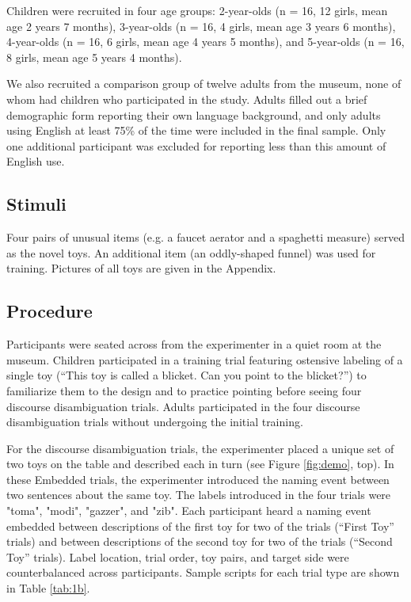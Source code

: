 \documentclass[man]{apa2}
\begin{document}
Children were recruited in four age groups: 2-year-olds (n = 16, 12 girls, mean age 2 years 7 months), 3-year-olds (n = 16, 4 girls, mean age 3 years 6 months), 4-year-olds (n = 16, 6 girls, mean age 4 years 5 months), and 5-year-olds (n = 16, 8 girls, mean age 5 years 4 months).  

We also recruited a comparison group of twelve adults from the museum, none of whom had children who participated in the study. Adults filled out a brief demographic form reporting their own language background, and only adults using English at least 75\% of the time were included in the final sample. Only one additional participant was excluded for reporting less than this amount of English use.  


\subsection{Stimuli}

Four pairs of unusual items (e.g. a faucet aerator and a spaghetti measure) served as the novel toys.  An additional item (an oddly-shaped funnel) was used for training. Pictures of all toys are given in the Appendix.

\subsection{Procedure}

Participants were seated across from the experimenter in a quiet room at the museum.  Children participated in a training trial featuring ostensive labeling of a single toy (``This toy is called a blicket.  Can you point to the blicket?'') to familiarize them to the design and to practice pointing before seeing four discourse disambiguation trials.  Adults participated in the four discourse disambiguation trials without undergoing the initial training. 

For the discourse disambiguation trials, the experimenter placed a unique set of two toys on the table and described each in turn (see Figure \ref{fig:demo}, top).  In these Embedded trials, the experimenter introduced the naming event between two sentences about the same toy.  The labels introduced in the four trials were "toma", "modi", "gazzer", and "zib".  Each participant heard a naming event embedded between descriptions of the first toy for two of the trials (``First Toy'' trials) and between descriptions of the second toy for two of the trials (``Second Toy'' trials).  Label location, trial order, toy pairs, and target side were counterbalanced across participants.  Sample scripts for each trial type are shown in Table \ref{tab:1b}.  
\end{document}
